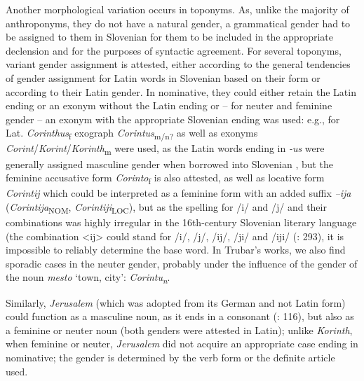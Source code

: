 \documentclass[output=paper,colorlinks,citecolor=brown,arabicfont,chinesefont]{langscibook}
\begin{document}
Another morphological variation occurs in toponyms. As, unlike the majority of anthroponyms, they do not have a natural gender, a grammatical gender had to be assigned to them in Slovenian for them to be included in the appropriate declension and for the purposes of syntactic agreement. For several toponyms, variant gender assignment is attested, either according to the general tendencies of gender assignment for Latin words in Slovenian based on their form \citep{Ahacic2011} or  according to their Latin gender. In nominative, they could either retain the Latin ending or an exonym without the Latin ending or – for neuter and feminine gender  – an exonym with the appropriate Slovenian ending was used: e.g., for Lat. \emph{Corinthus}\textsubscript{f} exograph \emph{Corintus}\textsubscript{m/n?} as well as exonyms \emph{Corint}/\emph{Korint}/\emph{Korinth}\textsubscript{m} were used, as the Latin words ending in \emph{-us} were generally assigned masculine gender when borrowed into Slovenian \citep[116]{Ahacic2011}, but the feminine accusative form \emph{Corinto}\textsubscript{f} is also attested, as well as locative form \emph{Corintij} which could be interpreted as a feminine form with an added suffix \emph{–ija} (\emph{Corintija}\textsubscript{NOM}, \emph{Corintiji}\textsubscript{LOC}), but as the spelling for /i/ and /j/ and their combinations was highly irregular in the 16th-century Slovenian literary language (the combination <ij> could stand for /i/, /j/, /ij/, /ji/ and /iji/ (\citealt{Jelovsek2020}: 293), it is impossible to reliably determine the base word. In Trubar's works, we also find sporadic cases in the neuter gender, probably under the influence of the gender of the noun \emph{mesto} ‘town, city’: \emph{Corintu\textsubscript{n}}.  

Similarly, \emph{Jerusalem} (which was adopted from its German and not Latin form) could function as a masculine noun, as it ends in a consonant (\citealt{Ahacic2011}: 116), but also as a feminine or neuter noun (both genders were attested in Latin); unlike \emph{Korinth}, when feminine or neuter, \emph{Jerusalem} did not acquire an appropriate case ending in nominative; the gender is determined by the verb form or the definite article used.
\end{document}
